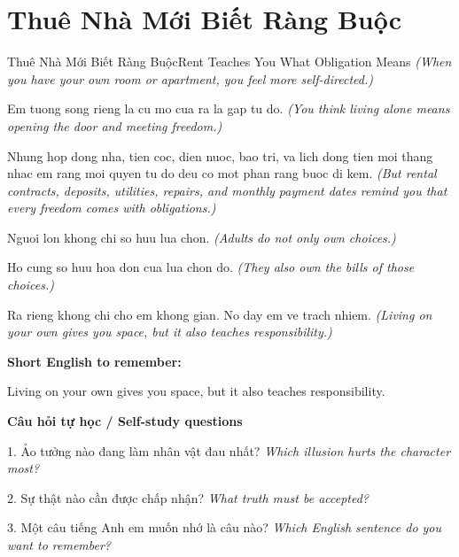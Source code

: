 \section{Thuê Nhà Mới Biết Ràng Buộc}
\begin{truyen}{Thuê Nhà Mới Biết Ràng Buộc}{Rent Teaches You What Obligation Means}
\textit{(When you have your own room or apartment, you feel more self-directed.)}

Em tuong song rieng la cu mo cua ra la gap tu do.
\textit{(You think living alone means opening the door and meeting freedom.)}

Nhung hop dong nha, tien coc, dien nuoc, bao tri, va lich dong tien moi thang nhac em rang moi quyen tu do deu co mot phan rang buoc di kem.
\textit{(But rental contracts, deposits, utilities, repairs, and monthly payment dates remind you that every freedom comes with obligations.)}

Nguoi lon khong chi so huu lua chon.
\textit{(Adults do not only own choices.)}

Ho cung so huu hoa don cua lua chon do.
\textit{(They also own the bills of those choices.)}

\end{truyen}

\begin{baihoc}
Ra rieng khong chi cho em khong gian. No day em ve trach nhiem.
\textit{(Living on your own gives you space, but it also teaches responsibility.)}
\end{baihoc}

\begin{ghinhoanh}
\textbf{Short English to remember:}

Living on your own gives you space, but it also teaches responsibility.

\end{ghinhoanh}

\begin{tuhocnhanh}
\textbf{Câu hỏi tự học / Self-study questions}

1. Ảo tưởng nào đang làm nhân vật đau nhất? \textit{Which illusion hurts the character most?}

2. Sự thật nào cần được chấp nhận? \textit{What truth must be accepted?}

3. Một câu tiếng Anh em muốn nhớ là câu nào? \textit{Which English sentence do you want to remember?}
\end{tuhocnhanh}
\ngancach

